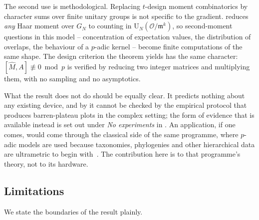 \documentclass{ceurart}
\theoremstyle{plain}
\theoremstyle{definition}
\theoremstyle{remark}
\theoremstyle{plain}
\newcommand{\OK}{\mathcal{O}}
\newcommand{\mm}{\mathfrak{m}}
\newcommand{\Uni}{\mathrm{U}}
\begin{document}
The second use is methodological. Replacing $t$-design moment combinatorics by
character sums over finite unitary groups is not specific to the gradient.
 reduces \emph{any} Haar moment over $G_N$ to counting in
$\Uni_N(\OK/\mm^{k})$, so second-moment questions in this model -- concentration
of expectation values, the distribution of overlaps, the behaviour of a
$p$-adic kernel -- become finite computations of the same shape. The design
criterion the theorem yields has the same character: $[\widehat M,A]\not\equiv0
\bmod p$ is verified by reducing two integer matrices and multiplying them,
with no sampling and no asymptotics.

What the result does not do should be equally clear. It predicts nothing about
any existing device, and by  it cannot be checked by the
empirical protocol that produces barren-plateau plots in the complex setting;
the form of evidence that is available instead is set out under \emph{No
experiments} in . An application, if
one comes, would come through the classical side of the same programme, where
$p$-adic models are used because taxonomies, phylogenies and other hierarchical
data are ultrametric to begin with~\cite{Kh98,ZuGa22,ZG24dnn,Ma25}. The
contribution here is to that programme's theory, not to its hardware.

\subsection{Limitations}
\label{sec:limitations}

We state the boundaries of the result plainly.
\end{document}
